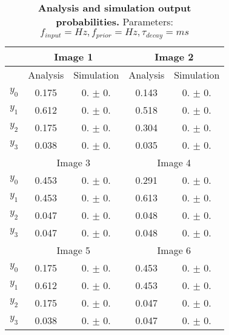 \begin{table}[]
\label{tab:1D___}
\small
\tabcolsep=0.11cm
\begin{tabular}{|c|cc|cc|}
\hline
                       & \multicolumn{2}{c|}{Image 1}                       & \multicolumn{2}{c|}{Image 2}                       \\ \hline
                       & \multicolumn{1}{c|}{Analysis} & Simulation         & \multicolumn{1}{c|}{Analysis} & Simulation         \\ \hline
$y_0$                  & \multicolumn{1}{c|}{0.175}    & 0. $\pm$ 0. & \multicolumn{1}{c|}{0.143}    & 0. $\pm$ 0. \\ \hline
$y_1$                  & \multicolumn{1}{c|}{0.612}    & 0. $\pm$ 0. & \multicolumn{1}{c|}{0.518}    & 0. $\pm$ 0. \\ \hline
$y_2$                  & \multicolumn{1}{c|}{0.175}    & 0. $\pm$ 0. & \multicolumn{1}{c|}{0.304}    & 0. $\pm$ 0. \\ \hline
$y_3$                  & \multicolumn{1}{c|}{0.038}    & 0. $\pm$ 0. & \multicolumn{1}{c|}{0.035}    & 0. $\pm$ 0. \\ \hline
                       & \multicolumn{2}{c|}{Image 3}                       & \multicolumn{2}{c|}{Image 4}                       \\ \hline
$y_0$                  & \multicolumn{1}{c|}{0.453}    & 0. $\pm$ 0. & \multicolumn{1}{c|}{0.291}    & 0. $\pm$ 0. \\ \hline
$y_1$                  & \multicolumn{1}{c|}{0.453}    & 0. $\pm$ 0. & \multicolumn{1}{c|}{0.613}    & 0. $\pm$ 0. \\ \hline
$y_2$                  & \multicolumn{1}{c|}{0.047}    & 0. $\pm$ 0. & \multicolumn{1}{c|}{0.048}    & 0. $\pm$ 0. \\ \hline
$y_3$                  & \multicolumn{1}{c|}{0.047}    & 0. $\pm$ 0. & \multicolumn{1}{c|}{0.048}    & 0. $\pm$ 0. \\ \hline
						& \multicolumn{2}{c|}{Image 5}                       & \multicolumn{2}{c|}{Image 6}                       \\ \hline
$y_0$                  & \multicolumn{1}{c|}{0.175}    & 0. $\pm$ 0. & \multicolumn{1}{c|}{0.453}    & 0. $\pm$ 0. \\ \hline
$y_1$                  & \multicolumn{1}{c|}{0.612}    & 0. $\pm$ 0. & \multicolumn{1}{c|}{0.453}    & 0. $\pm$ 0. \\ \hline
$y_2$                  & \multicolumn{1}{c|}{0.175}    & 0. $\pm$ 0. & \multicolumn{1}{c|}{0.047}    & 0. $\pm$ 0. \\ \hline
$y_3$                  & \multicolumn{1}{c|}{0.038}    & 0. $\pm$ 0. & \multicolumn{1}{c|}{0.047}    & 0. $\pm$ 0. \\ \hline
\end{tabular}
\caption{\textbf{Analysis and simulation output probabilities. } Parameters: $f_{input} =  Hz, f_{prior} =  Hz, \tau_{decay} =  ms$}
\end{table}

